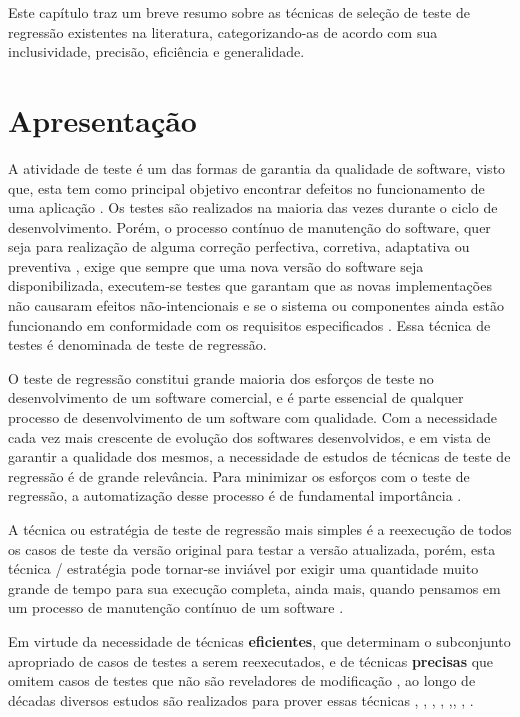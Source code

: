 
Este capítulo traz um breve resumo sobre as técnicas de seleção de teste de regressão existentes na literatura, categorizando-as de acordo com sua inclusividade, precisão, eficiência e generalidade.

\section{Apresentação}

A atividade de teste é um das formas de garantia da qualidade de software, visto que, esta tem como principal objetivo encontrar defeitos no funcionamento de uma aplicação \cite{HIRAMA2011}. Os testes são realizados na maioria das vezes durante o ciclo de desenvolvimento. Porém, o processo contínuo de manutenção do software, quer seja para realização de alguma correção perfectiva, corretiva, adaptativa ou preventiva \cite{DBLP:series/springer/Mens08}, exige que sempre que uma nova versão do software seja disponibilizada, executem-se testes que garantam que as novas implementações não causaram efeitos não-intencionais e se o sistema ou componentes ainda estão funcionando em conformidade com os requisitos especificados \cite{159342}. Essa técnica de testes é denominada de teste de regressão.

O teste de regressão constitui grande maioria dos esforços de teste no desenvolvimento de um software comercial, e é parte essencial de qualquer processo de desenvolvimento de um software com qualidade. Com a necessidade cada vez mais crescente de evolução dos softwares desenvolvidos, e em vista de garantir a qualidade dos mesmos, a necessidade de estudos de técnicas de teste de regressão é de grande relevância. Para minimizar os esforços com o teste de regressão, a automatização desse processo é de fundamental importância \cite{Ammann:2008:IST:1355340}.

A técnica ou estratégia de teste de regressão mais simples é a reexecução de todos os casos de teste da versão original para testar a versão atualizada, porém, esta técnica / estratégia pode tornar-se inviável por exigir uma quantidade muito grande de tempo para sua execução completa, ainda mais, quando pensamos em um processo de manutenção contínuo de um software \cite{Graves:2001:ESR:367008.367020}.

Em virtude da necessidade de técnicas \textbf{eficientes}, que determinam o subconjunto apropriado de casos de testes a serem reexecutados, e de técnicas \textbf{precisas} que omitem casos de testes que não são reveladores de modificação \cite{Ammann:2008:IST:1355340}, ao longo de décadas diversos estudos são realizados para prover essas técnicas \cite{WHITE1991}, \cite{Graves:2001:ESR:367008.367020}, \cite{630875}, \cite{536955}, \cite{ENGSTROM201014},\cite{ENGSTROM201014}, \cite{KAZMI2017}, \cite{ROMANO201862}.

